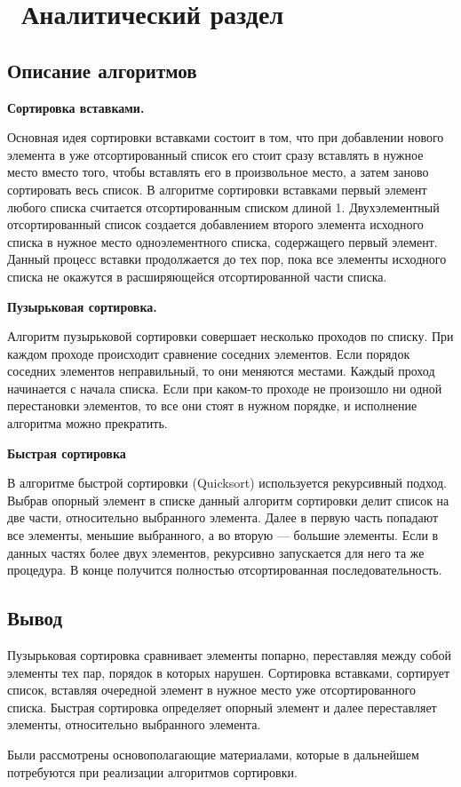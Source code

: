 
\chapter{ Аналитический раздел}
\label{cha:analysis}

\section{Описание алгоритмов}


\textbf{Сортировка вставками.}

Основная идея сортировки вставками состоит в том, что при добавлении нового элемента в уже отсортированный список его стоит сразу
вставлять в нужное место вместо того, чтобы вставлять его в произвольное место, а затем заново сортировать весь список.
В алгоритме сортировки вставками первый элемент любого списка считается отсортированным списком длиной 1.
Двухэлементный отсортированный список создается добавлением второго элемента исходного списка в нужное место одноэлементного списка, содержащего первый элемент. 
Данный процесс вставки продолжается до тех пор, 
пока все элементы исходного списка не окажутся в расширяющейся отсортированной части списка.

\textbf{Пузырьковая сортировка.}

Алгоритм пузырьковой сортировки совершает несколько проходов по списку. 
При каждом проходе происходит сравнение соседних элементов. 
Если порядок соседних элементов неправильный, то они меняются местами.
Каждый проход начинается с начала списка. 
Если при каком-то проходе не произошло ни одной перестановки элементов, то все они стоят в нужном порядке, и исполнение алгоритма
можно прекратить. 


\textbf{Быстрая сортировка}

В алгоритме быстрой сортировки (Quicksort) используется рекурсивный подход.
Выбрав опорный элемент в списке данный алгоритм сортировки делит список на две части, относительно выбранного элемента.
Далее в первую часть попадают все элементы, меньшие выбранного, а во вторую — большие элементы. 
Если в данных частях более двух элементов, рекурсивно запускается для него та же процедура. 
В конце получится полностью отсортированная последовательность.

\section{Вывод}

Пузырьковая сортировка сравнивает элементы попарно, переставляя между собой элементы тех пар, порядок в которых нарушен.
Сортировка вставками, сортирует список, вставляя очередной элемент в нужное место уже отсортированного списка.
Быстрая сортировка определяет опорный элемент и далее переставляет элементы, относительно выбранного элемента.

Были рассмотрены основополагающие материалами, которые в дальнейшем потребуются при реализации алгоритмов сортировки.  



